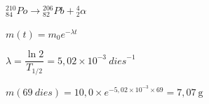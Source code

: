 \begin{solapartat}
 ${}^{210}_{84}\mathit{Po} \rightarrow {}^{206}_{82}\mathit{Pb} + {}^{4}_{2}\alpha$
\end{solapartat}

\begin{solapartat}
 $m(t) = m_0 e^{-\lambda t}$

 $\lambda = \dfrac{\ln 2}{T_{1/2}} = 5,02\times 10^{-3}\ \mathit{dies}^{-1}$

 $m(69\ \mathit{dies}) = 10,0\times e^{-5,02\times 10^{-3}\times 69} = 7,07\ \mathrm{g}$
\end{solapartat}
